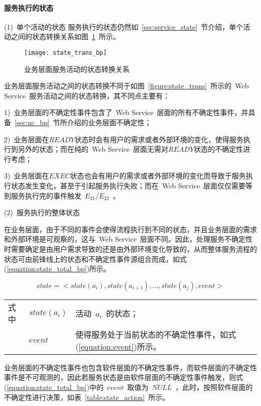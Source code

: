 \paragraph{服务执行的状态}

(1)~单个活动的状态
服务执行的状态仍然如~\ref{sec:service_state}~节介绍，单个活动之间的状态转换关系如图~\ref{figure:state_trans_pb}~所示。

\begin{figure}[htbp]
    \centering
    \texttt{[image: state\_trans\_bp]}
    \caption{业务层面服务活动的状态转换关系}\label{figure:state_trans_pb}
    \vspace{-1em}
\end{figure}

业务层面服务活动之间的状态转换不同于如图~\ref{figure:state_trans}~所示的~Web Service~服务活动之间的状态转换，其不同点主要有：

1)~业务层面的不确定性事件包含了~Web Service~层面的所有不确定性事件，并具备~\ref{sec:uc_bp}~节所介绍的业务层面不确定性；

2)~业务层面在$READY$状态时会有用户的需求或者外部环境的变化，使得服务执行到另外的状态；而在纯的~Web Service~层面无需对$READY$状态的不确定性进行考虑；

3)~业务层面在$EXEC$状态也会有用户的需求或者外部环境的变化而导致于服务执行状态发生变化，甚至于引起服务执行失败；而在~Web Service~层面仅仅需要等到服务执行完的事件触发~$E_{21}/E_{22}$~。

(2)~服务执行的整体状态

在业务层面，由于不同的事件会使得流程执行到不同的状态，并且业务层面的需求和外部环境是可观察的，这与~Web Service~层面不同。因此，处理服务不确定性时需要确定是由用户需求导致的还是由外部环境变化导致的，从而整体服务流程的状态可由前锋线上的状态和不确定性事件源组合而成，如式(\ref{equation:state_total_bp})所示。

\begin{equation}\label{equation:state_total_bp}
state = < state(a_i),state(a_{i+1}),..., state(a_j), event >
\end{equation}
\begin{tabularx}{\textwidth}{@{}l@{\quad}l@{\pozhehao }X@{}}
    式中
    & $state(a_i)$ & 活动~$a_i$~的状态；\\
    & $event$ & 使得服务处于当前状态的不确定性事件，如式(\ref{equation:event})所示。
\end{tabularx}\vspace{\wordsep}

业务层面的不确定性事件也包含软件层面的不确定性事件，而软件层面的不确定性事件是不可观测的，因此若服务状态是由软件层面的不确定性事件触发，则式(\ref{equation:state_total_bp})中的~$event$~取值为~$NULL$~，此时，按照软件层面的不确定性进行决策，如表~\ref{table:state_action}~所示。

